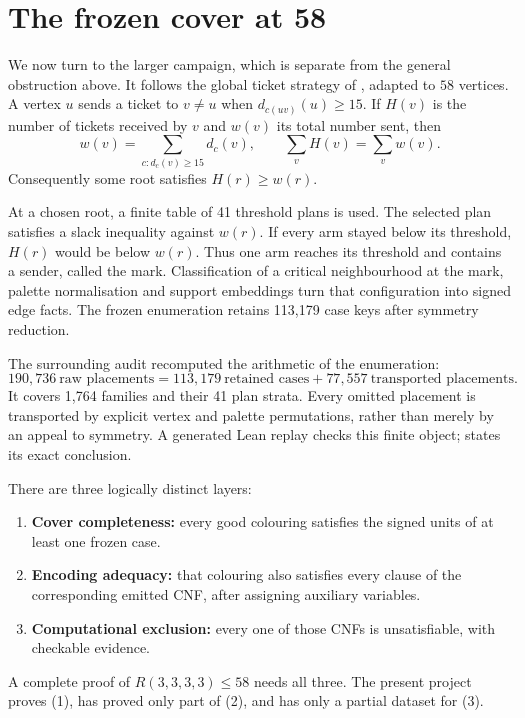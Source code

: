 \documentclass[11pt]{article}
\newcommand{\R}{R(3,3,3,3)}
\theoremstyle{definition}
\theoremstyle{remark}
\begin{document}
\section{The frozen cover at 58}\label{sec:cover}

We now turn to the larger campaign, which is separate from the general
obstruction above.  It follows the global ticket strategy of
\cite{Tatarevic2026}, adapted to $58$ vertices.  A vertex $u$ sends a ticket
to $v\neq u$ when $d_{c(uv)}(u)\geq15$.  If $H(v)$ is the number of tickets
received by $v$ and $w(v)$ its total number sent, then
\[
 w(v)=\sum_{c:d_c(v)\geq15}d_c(v),\qquad
 \sum_v H(v)=\sum_v w(v).
\]
Consequently some root satisfies $H(r)\geq w(r)$.

At a chosen root, a finite table of 41 threshold plans is used.  The selected
plan satisfies a slack inequality against $w(r)$.  If every arm stayed below
its threshold, $H(r)$ would be below $w(r)$.  Thus one arm reaches its
threshold and contains a sender, called the mark.  Classification of a critical
neighbourhood at the mark, palette normalisation and support embeddings turn
that configuration into signed edge facts.  The frozen enumeration retains
113,179 case keys after symmetry reduction.

The surrounding audit recomputed the arithmetic of the enumeration:
\[
 190,736\ \text{raw placements}
 =113,179\ \text{retained cases}+77,557\ \text{transported placements}.
\]
It covers 1,764 families and their 41 plan strata.  Every omitted placement
is transported by explicit vertex and palette permutations, rather than merely
by an appeal to symmetry.  A generated Lean replay checks this finite object;
 states its exact conclusion.

There are three logically distinct layers:
\begin{enumerate}[label=\textup{(\arabic*)},nosep]
 \item \textbf{Cover completeness:} every good colouring satisfies the signed
 units of at least one frozen case.
 \item \textbf{Encoding adequacy:} that colouring also satisfies every clause
 of the corresponding emitted CNF, after assigning auxiliary variables.
 \item \textbf{Computational exclusion:} every one of those CNFs is
 unsatisfiable, with checkable evidence.
\end{enumerate}
A complete proof of $\R\leq58$ needs all three.  The present project proves
(1), has proved only part of (2), and has only a partial dataset for (3).
\end{document}
